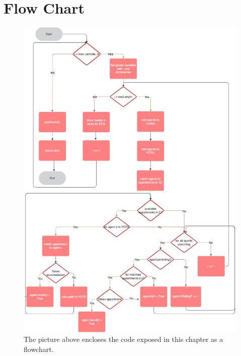 \section{Flow Chart}
\begin{figure}[ht]
\centering 
\includegraphics[width=0.71\linewidth]{figures/Flowchart.png}
\caption{The picture above encloses the code exposed in this chapter as a flowchart.}
\end{figure}
